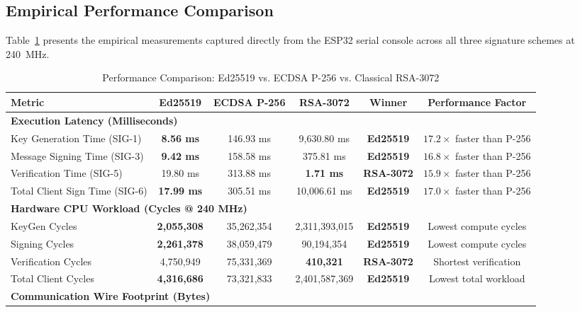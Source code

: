 \documentclass[11pt,a4paper]{article}
\begin{document}
\subsection{Empirical Performance Comparison}

Table~\ref{tab:comparison_summary} presents the empirical measurements captured directly from the ESP32 serial console across all three signature schemes at 240~MHz.

\begin{table}[htbp]
\centering
\footnotesize
\setlength{\tabcolsep}{2.0pt}
\caption{Performance Comparison: Ed25519 vs. ECDSA P-256 vs. Classical RSA-3072}
\label{tab:comparison_summary}
\begin{tabular}{l c c c c c}
\toprule
\textbf{Metric} & \textbf{Ed25519} & \textbf{ECDSA P-256} & \textbf{RSA-3072} & \textbf{Winner} & \textbf{Performance Factor} \\
\midrule
\multicolumn{6}{l}{\textbf{Execution Latency (Milliseconds)}} \\
Key Generation Time (SIG-1)     & \textbf{8.56 ms}   & 146.93 ms  & 9,630.80 ms  & \textbf{Ed25519} & $17.2\times$ faster than P-256 \\
Message Signing Time (SIG-3)    & \textbf{9.42 ms}   & 158.58 ms  & 375.81 ms    & \textbf{Ed25519} & $16.8\times$ faster than P-256 \\
Verification Time (SIG-5)       & 19.80 ms           & 313.88 ms  & \textbf{1.71 ms} & \textbf{RSA-3072} & $15.9\times$ faster than P-256 \\
Total Client Sign Time (SIG-6)  & \textbf{17.99 ms}  & 305.51 ms  & 10,006.61 ms & \textbf{Ed25519} & $17.0\times$ faster than P-256 \\
\midrule
\multicolumn{6}{l}{\textbf{Hardware CPU Workload (Cycles @ 240 MHz)}} \\
KeyGen Cycles                   & \textbf{2,055,308} & 35,262,354 & 2,311,393,015 & \textbf{Ed25519} & Lowest compute cycles \\
Signing Cycles                  & \textbf{2,261,378} & 38,059,479 & 90,194,354    & \textbf{Ed25519} & Lowest compute cycles \\
Verification Cycles             & 4,750,949          & 75,331,369 & \textbf{410,321} & \textbf{RSA-3072} & Shortest verification \\
Total Client Cycles             & \textbf{4,316,686} & 73,321,833 & 2,401,587,369 & \textbf{Ed25519} & Lowest total workload \\
\midrule
\multicolumn{6}{l}{\textbf{Communication Wire Footprint (Bytes)}} \\

\end{tabular}
\end{table}
\end{document}
